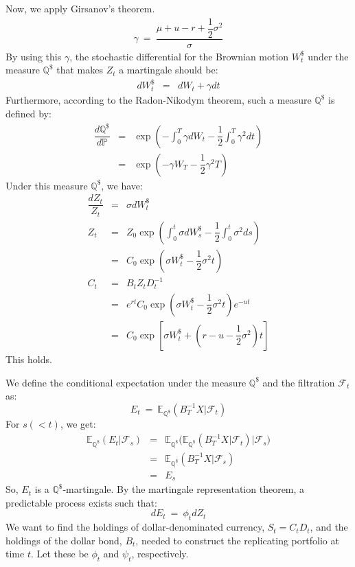 \documentclass[uplatex,a4j,12pt,dvipdfmx]{jsarticle}
\begin{document}
Now, we apply Girsanov's theorem.
%
%
\begin{eqnarray*}
	\gamma
	\ = \
	\dfrac{ \mu + u - r + \dfrac{1}{2} \sigma^{2} }{\sigma}
\end{eqnarray*}
%
%
By using this $\gamma$, the stochastic differential for the Brownian motion $W^{\$}_{t}$ under the measure $\mathbb{Q}^{\$}$ that makes $Z_{t}$ a martingale should be:
%
%
\begin{eqnarray*}
	d W^{\$}_{t}
	&=&
	d W_{t}
	+
	\gamma dt
\end{eqnarray*}
%
%
Furthermore, according to the Radon-Nikodym theorem, such a measure $\mathbb{Q}^{\$}$ is defined by:
%
%
\begin{eqnarray*}
	\dfrac{ d \mathbb{Q}^{\$} }{ d \mathbb{P} }
	&=&
	\exp
	\left(
	- \int^{T}_{0} \gamma dW_{t}
	- \dfrac{1}{2} \int^{T}_{0} \gamma^{2} dt
	\right)
	\\ &=&
	\exp
	\left(
	-\gamma W_{T}
	- \dfrac{1}{2} \gamma^{2}T
	\right)
\end{eqnarray*}
%
%
Under this measure $\mathbb{Q}^{\$}$, we have:
%
%
\begin{eqnarray*}
	\dfrac{ d Z_{t} }{ Z_{t} }
	&=&
	\sigma dW^{\$}_{t}
	\\
	Z_{t}
	&=&
	Z_{0} \exp
	\left(
	\int^{t}_{0} \sigma dW^{\$}_{s}
	-
	\dfrac{1}{2}
	\int^{t}_{0} \sigma^{2} ds
	\right)
	\\ &=&
	C_{0}
	\exp
	\left(
	\sigma W^{\$}_{t}
	-
	\dfrac{1}{2}
	\sigma^{2} t
	\right)
	\\
	C_{t}
	&=&
	B_{t} Z_{t} D^{-1}_{t}
	\\ &=&
	e^{rt}
	C_{0}
	\exp
	\left(
	\sigma W^{\$}_{t}
	-
	\dfrac{1}{2}
	\sigma^{2} t
	\right)
	e^{-ut}
	\\ &=&
	C_{0}
	\exp
	\left[
		\sigma W^{\$}_{t}
		+
		\left(
		r - u -
		\dfrac{1}{2}
		\sigma^{2}
		\right) t
		\right]
\end{eqnarray*}
%
%
This holds.

We define the conditional expectation under the measure $\mathbb{Q}^{\$}$ and the filtration $\mathcal{F}_{t}$ as:
$$
	E_{t}
	\ = \
	\mathbb{E}_{\mathbb{Q}^{ \$ }}
	( B_{T}^{-1} X | \mathcal{F}_{t} )
$$
For $s(<t)$, we get:
%
%
\begin{eqnarray*}
	\mathbb{E}_{\mathbb{Q}^{ \$ }}
	( E_{t} | \mathcal{F}_{s} )
	&=&
	\mathbb{E}_{\mathbb{Q}^{ \$ }}
	\Big(
	\mathbb{E}_{\mathbb{Q}^{ \$ }}
	( B_{T}^{-1} X | \mathcal{F}_{t} )
	\Big| \mathcal{F}_{s} \Big)
	\\ &=&
	\mathbb{E}_{\mathbb{Q}^{ \$ }}
	( B_{T}^{-1} X | \mathcal{F}_{s} )
	\\ &=&
	E_{s}
\end{eqnarray*}
%
%
So, $E_{t}$ is a $\mathbb{Q}^{ \$ }$-martingale. By the martingale representation theorem, a predictable process exists such that:
$$
	dE_{t} \ = \ \phi_{t} dZ_{t}
$$
We want to find the holdings of dollar-denominated currency, $S_{t} = C_{t} D_{t}$, and the holdings of the dollar bond, $B_{t}$, needed to construct the replicating portfolio at time $t$. Let these be $\phi_{t}$ and $\psi_{t}$, respectively.
\end{document}
